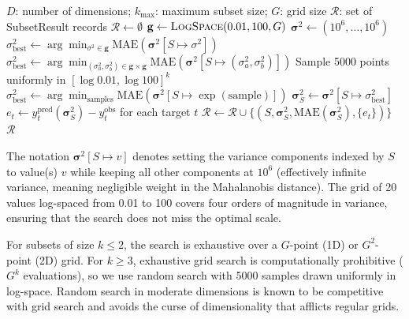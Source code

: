 \documentclass[12pt]{article}
\newcommand{\MAE}{\mathrm{MAE}}
\begin{document}
\begin{algorithm}[H]
\caption{\textsc{DimensionEnumeration}$(D, k_{\max}, G)$}
\label{alg:enumerate}
\begin{algorithmic}[1]
\REQUIRE $D$: number of dimensions; $k_{\max}$: maximum subset size; $G$: grid size
\ENSURE $\mathcal{R}$: set of SubsetResult records
\STATE $\mathcal{R} \leftarrow \emptyset$
\STATE $\mathbf{g} \leftarrow \textsc{LogSpace}(0.01, 100, G)$ 
        \STATE $\boldsymbol{\sigma}^2 \leftarrow (10^6, \ldots, 10^6)$ 
            \STATE $\sigma_{\mathrm{best}}^2 \leftarrow \arg\min_{\sigma^2 \in \mathbf{g}} \MAE(\boldsymbol{\sigma}^2[S \mapsto \sigma^2])$ 
            \STATE $\sigma_{\mathrm{best}}^2 \leftarrow \arg\min_{(\sigma_a^2, \sigma_b^2) \in \mathbf{g} \times \mathbf{g}} \MAE(\boldsymbol{\sigma}^2[S \mapsto (\sigma_a^2, \sigma_b^2)])$ 
        \ELSE
            \STATE Sample 5000 points uniformly in $[\log 0.01, \log 100]^k$ 
            \STATE $\sigma_{\mathrm{best}}^2 \leftarrow \arg\min_{\text{samples}} \MAE(\boldsymbol{\sigma}^2[S \mapsto \exp(\text{sample})])$
        \ENDIF
        \STATE $\boldsymbol{\sigma}_S^2 \leftarrow \boldsymbol{\sigma}^2[S \mapsto \sigma_{\mathrm{best}}^2]$
        \STATE $e_t \leftarrow y_t^{\mathrm{pred}}(\boldsymbol{\sigma}_S^2) - y_t^{\mathrm{obs}}$ for each target $t$
        \STATE $\mathcal{R} \leftarrow \mathcal{R} \cup \{(S, \boldsymbol{\sigma}_S^2, \MAE(\boldsymbol{\sigma}_S^2), \{e_t\})\}$
    \ENDFOR
\ENDFOR
\RETURN $\mathcal{R}$
\end{algorithmic}
\end{algorithm}

The notation $\boldsymbol{\sigma}^2[S \mapsto v]$ denotes setting the variance components indexed by $S$ to value(s) $v$ while keeping all other components at $10^6$ (effectively infinite variance, meaning negligible weight in the Mahalanobis distance).  The grid of 20 values log-spaced from 0.01 to 100 covers four orders of magnitude in variance, ensuring that the search does not miss the optimal scale.

For subsets of size $k \leq 2$, the search is exhaustive over a $G$-point (1D) or $G^2$-point (2D) grid.  For $k \geq 3$, exhaustive grid search is computationally prohibitive ($G^k$ evaluations), so we use random search with 5000 samples drawn uniformly in log-space.  Random search in moderate dimensions is known to be competitive with grid search \cite{bergstra2012} and avoids the curse of dimensionality that afflicts regular grids.
\end{document}
